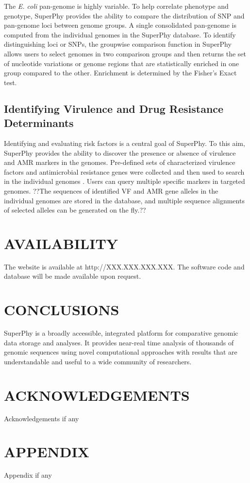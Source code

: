 \documentclass[a4paper,twoside]{article}
\begin{document}
The \textit{E. coli} pan-genome is highly variable. To help correlate phenotype and genotype, SuperPhy provides the ability to compare the distribution of SNP and pan-genome loci between genome groups. A single consolidated pan-genome is computed from the individual genomes in the SuperPhy database. To identify distinguishing loci or SNPs, the groupwise comparison function in SuperPhy allows users to select genomes in two comparison groups and then returns the set of nucleotide variations or genome regions that are statistically enriched in one group compared to the other. Enrichment is determined by the Fisher's Exact test.

\subsection{Identifying Virulence and Drug Resistance Determinants}

Identifying and evaluating risk factors is a central goal of SuperPhy. To this aim, SuperPhy provides the ability to discover the presence or absence of virulence and AMR markers in the genomes.  Pre-defined sets of characterized virulence factors and antimicrobial resistance genes were collected and then used to search in the individual genomes \cite{mcarthur2012card,chen2012vfdb,chen2005vfdb}. Users can query multiple specific markers in targeted genomes. ??The sequences of identified VF and AMR gene alleles in the individual genomes are stored in the database, and multiple sequence alignments of selected alleles can be generated on the fly.??

\section{\uppercase{Availability}}
\label{sec:availability}

The website is available at http://XXX.XXX.XXX.XXX. The software code and database will be made available upon request.

\section{\uppercase{Conclusions}}
\label{sec:conclusion}

\noindent SuperPhy is a broadly accessible, integrated platform for comparative genomic data storage and analyses. It provides near-real time analysis of thousands of genomic sequences using novel computational approaches with results that are understandable and useful to a wide community of researchers.

\section*{\uppercase{Acknowledgements}}

\noindent Acknowledgements if any


\vfill

{\small
}


\section*{\uppercase{Appendix}}

\noindent Appendix if any

\vfill
\end{document}
